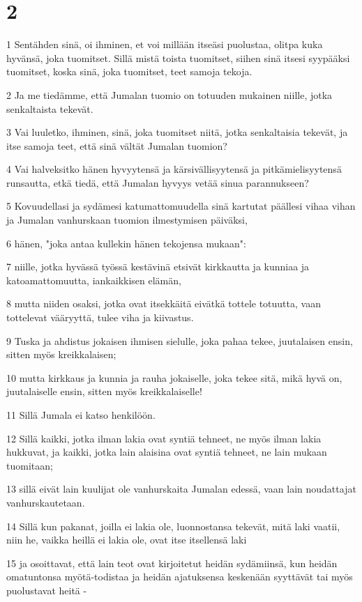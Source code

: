 \chapter{2}

\par 1 Sentähden sinä, oi ihminen, et voi millään itseäsi puolustaa, olitpa kuka hyvänsä, joka tuomitset. Sillä mistä toista tuomitset, siihen sinä itsesi syypääksi tuomitset, koska sinä, joka tuomitset, teet samoja tekoja.
\par 2 Ja me tiedämme, että Jumalan tuomio on totuuden mukainen niille, jotka senkaltaista tekevät.
\par 3 Vai luuletko, ihminen, sinä, joka tuomitset niitä, jotka senkaltaisia tekevät, ja itse samoja teet, että sinä vältät Jumalan tuomion?
\par 4 Vai halveksitko hänen hyvyytensä ja kärsivällisyytensä ja pitkämielisyytensä runsautta, etkä tiedä, että Jumalan hyvyys vetää sinua parannukseen?
\par 5 Kovuudellasi ja sydämesi katumattomuudella sinä kartutat päällesi vihaa vihan ja Jumalan vanhurskaan tuomion ilmestymisen päiväksi,
\par 6 hänen, "joka antaa kullekin hänen tekojensa mukaan":
\par 7 niille, jotka hyvässä työssä kestävinä etsivät kirkkautta ja kunniaa ja katoamattomuutta, iankaikkisen elämän,
\par 8 mutta niiden osaksi, jotka ovat itsekkäitä eivätkä tottele totuutta, vaan tottelevat vääryyttä, tulee viha ja kiivastus.
\par 9 Tuska ja ahdistus jokaisen ihmisen sielulle, joka pahaa tekee, juutalaisen ensin, sitten myös kreikkalaisen;
\par 10 mutta kirkkaus ja kunnia ja rauha jokaiselle, joka tekee sitä, mikä hyvä on, juutalaiselle ensin, sitten myös kreikkalaiselle!
\par 11 Sillä Jumala ei katso henkilöön.
\par 12 Sillä kaikki, jotka ilman lakia ovat syntiä tehneet, ne myös ilman lakia hukkuvat, ja kaikki, jotka lain alaisina ovat syntiä tehneet, ne lain mukaan tuomitaan;
\par 13 sillä eivät lain kuulijat ole vanhurskaita Jumalan edessä, vaan lain noudattajat vanhurskautetaan.
\par 14 Sillä kun pakanat, joilla ei lakia ole, luonnostansa tekevät, mitä laki vaatii, niin he, vaikka heillä ei lakia ole, ovat itse itsellensä laki
\par 15 ja osoittavat, että lain teot ovat kirjoitetut heidän sydämiinsä, kun heidän omatuntonsa myötä-todistaa ja heidän ajatuksensa keskenään syyttävät tai myös puolustavat heitä -
